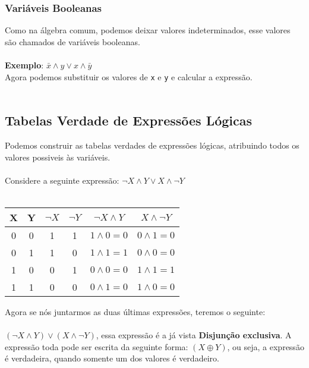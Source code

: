 \documentclass[12pt, onecolumn]{article}
\begin{document}
		\subsubsection{\centering Variáveis Booleanas}
	
	Como na álgebra comum, podemos deixar valores indeterminados, esse valores
	são chamados de variáveis booleanas.\\
	\\
	\textbf{Exemplo}: $\bar{x} \land y \lor x \land \bar{y}$\\
	Agora podemos substituir os valores de \texttt{x} e \texttt{y} e calcular
	a expressão.\\
	\\
		\subsection{\centering Tabelas Verdade de Expressões Lógicas}

	Podemos construir as tabelas verdades de expressões lógicas, atribuindo
	todos os valores possiveis às variáveis.\\
	\\
	Considere a seguinte expressão: $\lnot{X} \land Y \lor X \land \lnot{Y}$ \\
	\\
	\begin{table}[ht]
		\centering
		\begin{tabular}{|c|c|c|c|c|c|}
			\hline
			X & Y & $\lnot{X}$ & $\lnot{Y}$ & $\lnot X \land Y$
			& $X\land \lnot Y$ \\ \hline

			0 & 0 & 1 & 1 & $1 \land 0 = 0$ & $0 \land 1 = 0$\\
			0 & 1 & 1 & 0 & $1 \land 1 = 1$ & $0 \land 0 = 0$\\
			1 & 0 & 0 & 1 & $0 \land 0 = 0$ & $1 \land 1 = 1$\\
			1 & 1 & 0 & 0 & $0 \land 1 = 0$ & $1 \land 0 = 0$\\
			\hline
		\end{tabular}
	\end{table}

	Agora se nós juntarmos as duas últimas expressões, teremos o seguinte:\\
	\\
	$(\lnot X \land Y) \lor (X \land \lnot Y)$, essa expressão é a já vista
	\textbf{Disjunção exclusiva}. A expressão toda pode ser escrita da seguinte 
	forma: $(X \oplus Y)$, ou seja, a expressão é verdadeira, quando somente um 
	dos valores é verdadeiro.
\end{document}
